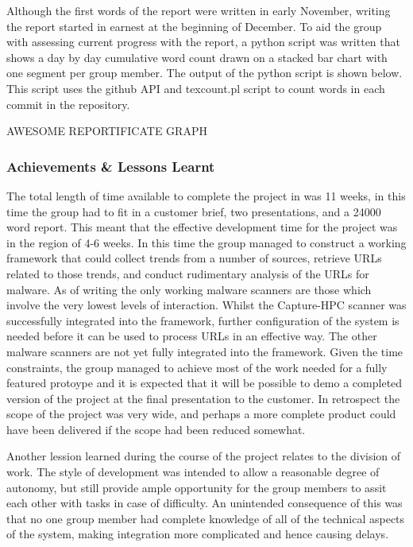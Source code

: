 Although the first words of the report were written in early November, writing
the report started in earnest at the beginning of December. To aid the group
with assessing current progress with the report, a python script was written
that shows a day by day cumulative word count drawn on a stacked bar chart with
one segment per group member. The output of the python script is shown below.
This script uses the github API and texcount.pl script to count words in each
commit in the repository.

AWESOME REPORTIFICATE GRAPH

\subsubsection{Achievements \& Lessons Learnt}

The total length of time available to complete the project in was 11 weeks, in
this time the group had to fit in a customer brief, two presentations, and a
24000 word report. This meant that the effective development time for the
project was in the region of 4-6 weeks. In this time the group managed to
construct a working framework that could collect trends from a number of
sources, retrieve URLs related to those trends, and conduct rudimentary analysis
of the URLs for malware. As of writing the only working malware scanners are
those which involve the very lowest levels of interaction. Whilst the
Capture-HPC scanner was successfully integrated into the framework, further
configuration of the system is needed before it can be used to process URLs in
an effective way. The other malware scanners are not yet fully integrated into
the framework. Given the time constraints, the group managed to achieve most of
the work needed for a fully featured protoype and it is expected that it will be
possible to demo a completed version of the project at the final presentation to
the customer. In retrospect the scope of the project was very wide, and perhaps
a more complete product could have been delivered if the scope had been reduced
somewhat.

Another lession learned during the course of the project relates to the division
of work. The style of development was intended to allow a reasonable degree of
autonomy, but still provide ample opportunity for the group members to assit
each other with tasks in case of difficulty. An unintended consequence of this
was that no one group member had complete knowledge of all of the technical
aspects of the system, making integration more complicated and hence causing
delays.



